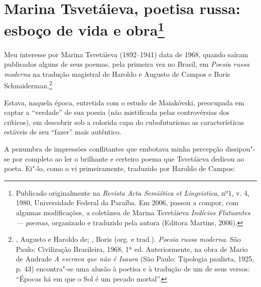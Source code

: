 \chapter{Marina Tsvetáieva, poetisa russa:\\
esboço de vida e obra\footnote{Publicado originalmente na \emph{Revista Acta
Semiótica et Lingvistica}, nº1, v. 4, 1980, Universidade Federal
da Paraíba. Em 2006, passou a compor, com algumas modificações,
a coletânea de Marina Tsvetáieva \emph{Indícios Flutuantes ---
poemas}, organizado e traduzido pela autora (Editora Martins, 2006).}}
\label{marina}

Meu interesse por Marina Tsvetáieva (1892--1941) data de 1968,
quando saíram publicados alguns de seus poemas, pela primeira vez
no Brasil, em \emph{Poesia russa moderna} na tradução magistral de
Haroldo e Augusto de Campos e Boris Schnaiderman.\footnote{, Augusto e Haroldo de; , Boris (org. e trad.). \emph{Poesia russa moderna}. São Paulo: Civilização Brasileira, 1968, 1ª ed. Anteriormente, na obra de Mario de Andrade \emph{A escrava que não é Isaura}
(São Paulo: Tipologia paulista, 1925, p. 43) encontra"-se uma
alusão à poetisa e à tradução de um de seus versos: ``Épocas há
em que o Sol é um pecado mortal''.}

Estava, naquela época, entretida com o estudo de Maiakóvski,
preocupada em captar a ``verdade'' de sua poesia (não mistificada
pelas controvérsias dos críticos), em descobrir sob a colorida capa
do cubofuturismo as características estáveis de seu ``fazer'' mais
autêntico.

A penumbra de impressões conflitantes que embotava minha percepção
dissipou"-se por completo ao ler o brilhante e certeiro poema
que Tsvetáieva dedicou ao poeta. Ei"-lo, como o vi primeiramente,
traduzido por Haroldo de Campos:

